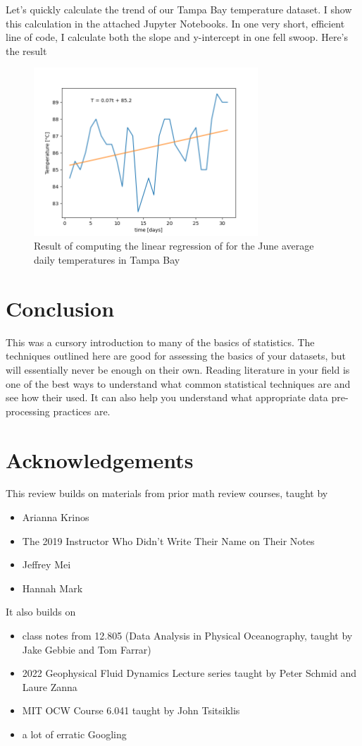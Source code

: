 \documentclass{article}
\begin{document}
Let's quickly calculate the trend of our Tampa Bay temperature dataset. I show this calculation in the attached Jupyter Notebooks. In one very short, efficient line of code, I calculate both the slope and y-intercept in one fell swoop. Here's the result

\begin{figure}[htbp]
\centerline{\includegraphics[width = 0.75\textwidth]{regression.png}}
\caption[]{\label{fig:regression} Result of computing the linear regression of for the June average daily temperatures in Tampa Bay}
\end{figure}

\section{Conclusion}
This was a cursory introduction to many of the basics of statistics. The techniques outlined here are good for assessing the basics of your datasets, but will essentially never be enough on their own. Reading literature in your field is one of the best ways to understand what common statistical techniques are and see how their used. It can also help you understand what appropriate data pre-processing practices are.

\clearpage
\section{Acknowledgements}
This review builds on materials from prior math review courses, taught by
\begin{itemize}
\item Arianna Krinos
\item The 2019 Instructor Who Didn't Write Their Name on Their Notes
\item Jeffrey Mei
\item Hannah Mark
\end{itemize}

It also builds on
\begin{itemize}
\item class notes from 12.805 (Data Analysis in Physical Oceanography, taught by Jake Gebbie and Tom Farrar)
\item 2022 Geophysical Fluid Dynamics Lecture series taught by Peter Schmid and Laure Zanna
\item MIT OCW Course 6.041 taught by John Tsitsiklis
\item a lot of erratic Googling 
\end{itemize}
\end{document}
